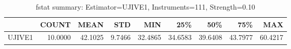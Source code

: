 \begin{table}[ht]
\centering
\caption{fstat summary: Estimator=UJIVE1, Instruments=111, Strength=0.10}
\begin{tabular}{lrrrrrrrr}
\toprule
 & COUNT & MEAN & STD & MIN & 25\% & 50\% & 75\% & MAX \\
\midrule
UJIVE1 & 10.0000 & 42.1025 & 9.7466 & 32.4865 & 34.6583 & 39.6408 & 43.7977 & 60.4217 \\
\bottomrule
\end{tabular}
\end{table}

